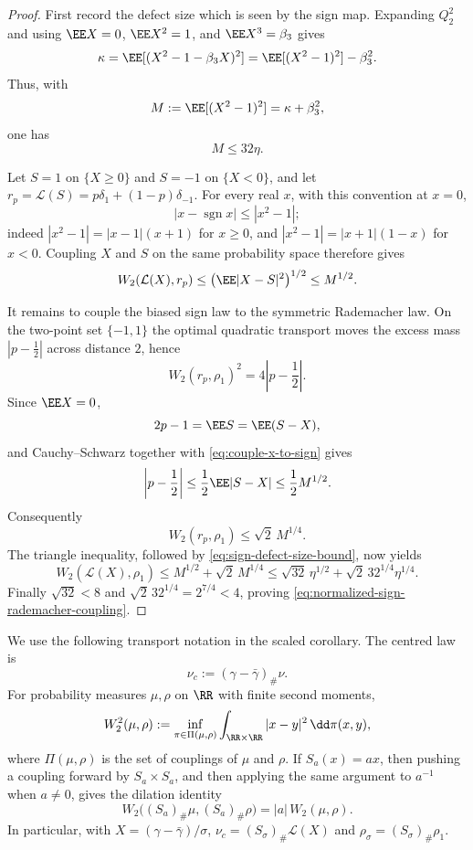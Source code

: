 \begin{proof}
First record the defect size which is seen by the sign map.  Expanding
\(Q_2^2\) and using \(\EE X=0\), \(\EE X^2=1\), and
\(\EE X^3=\beta_3\) gives
\[
\kappa
=\EE[(X^2-1-\beta_3X)^2]
=\EE[(X^2-1)^2]-\beta_3^2.
\]
Thus, with
\[
M:=\EE[(X^2-1)^2]=\kappa+\beta_3^2,
\]
one has
\begin{equation}\label{eq:sign-defect-size-bound}
M\le 32\eta .
\end{equation}

Let \(S=1\) on \(\{X\ge0\}\) and \(S=-1\) on \(\{X<0\}\), and let
\(r_p=\mathcal L(S)=p\delta_1+(1-p)\delta_{-1}\).  For every real \(x\),
with this convention at \(x=0\),
\[
|x-\operatorname{sgn}x|\le |x^2-1|;
\]
indeed \(|x^2-1|=|x-1|(x+1)\) for \(x\ge0\), and
\(|x^2-1|=|x+1|(1-x)\) for \(x<0\).  Coupling \(X\) and \(S\) on the same
probability space therefore gives
\begin{equation}\label{eq:couple-x-to-sign}
W_2(\mathcal L(X),r_p)
\le \bigl(\EE|X-S|^2\bigr)^{1/2}
\le M^{1/2}.
\end{equation}

It remains to couple the biased sign law to the symmetric Rademacher law.
On the two-point set \(\{-1,1\}\) the optimal quadratic transport moves the
excess mass \(|p-\frac12|\) across distance \(2\), hence
\[
W_2(r_p,\rho_1)^2=4\left|p-\frac12\right|.
\]
Since \(\EE X=0\),
\[
2p-1=\EE S=\EE(S-X),
\]
and Cauchy--Schwarz together with \eqref{eq:couple-x-to-sign} gives
\[
\left|p-\frac12\right|
\le \frac12\EE|S-X|
\le \frac12 M^{1/2}.
\]
Consequently
\begin{equation}\label{eq:couple-biased-sign-to-symmetric}
W_2(r_p,\rho_1)\le \sqrt2\,M^{1/4}.
\end{equation}
The triangle inequality, followed by \eqref{eq:sign-defect-size-bound}, now
yields
\[
W_2(\mathcal L(X),\rho_1)
\le M^{1/2}+\sqrt2\,M^{1/4}
\le \sqrt{32}\,\eta^{1/2}+\sqrt2\,32^{1/4}\eta^{1/4}.
\]
Finally \(\sqrt{32}<8\) and \(\sqrt2\,32^{1/4}=2^{7/4}<4\), proving
\eqref{eq:normalized-sign-rademacher-coupling}.
\end{proof}

We use the following transport notation in the scaled corollary.  The centred
law is
\[
\nu_c:=(\gamma-\bar{\gamma})_\#\nu .
\]
For probability measures \(\mu,\rho\) on \(\RR\) with finite second moments,
\[
W_2^2(\mu,\rho)
:=\inf_{\pi\in\Pi(\mu,\rho)}
\int_{\RR\times\RR}|x-y|^2\,\dd\pi(x,y),
\]
where \(\Pi(\mu,\rho)\) is the set of couplings of \(\mu\) and \(\rho\).  If
\(S_a(x)=ax\), then pushing a coupling forward by \(S_a\times S_a\), and then
applying the same argument to \(a^{-1}\) when \(a\ne0\), gives the dilation
identity
\[
W_2\bigl((S_a)_\#\mu,(S_a)_\#\rho\bigr)=|a|\,W_2(\mu,\rho).
\]
In particular, with \(X=(\gamma-\bar{\gamma})/\sigma\),
\(\nu_c=(S_\sigma)_\#\mathcal L(X)\) and
\(\rho_\sigma=(S_\sigma)_\#\rho_1\).

